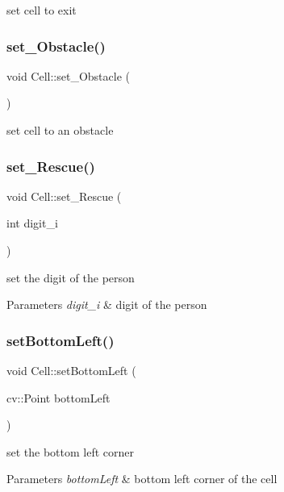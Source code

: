 set cell to exit \mbox{\label{class_cell_af7d43434293cf3df61c07b95af4c3be6}} 
\subsubsection{\texorpdfstring{set\+\_\+\+Obstacle()}{set\_Obstacle()}}
{\footnotesize\ttfamily void Cell\+::set\+\_\+\+Obstacle (\begin{DoxyParamCaption}{ }\end{DoxyParamCaption})}

set cell to an obstacle \mbox{\label{class_cell_a9fbed46923e15b7c576b438017ba0673}} 
\subsubsection{\texorpdfstring{set\+\_\+\+Rescue()}{set\_Rescue()}}
{\footnotesize\ttfamily void Cell\+::set\+\_\+\+Rescue (\begin{DoxyParamCaption}\item[{int}]{digit\+\_\+i }\end{DoxyParamCaption})}

set the digit of the person 
\begin{DoxyParams}{Parameters}
{\em digit\+\_\+i} & digit of the person \\
\hline
\end{DoxyParams}
\mbox{\label{class_cell_a86387a50a4c3f641eede253ce6cfcddb}} 
\subsubsection{\texorpdfstring{set\+Bottom\+Left()}{setBottomLeft()}}
{\footnotesize\ttfamily void Cell\+::set\+Bottom\+Left (\begin{DoxyParamCaption}\item[{cv\+::\+Point}]{bottom\+Left }\end{DoxyParamCaption})}

set the bottom left corner 
\begin{DoxyParams}{Parameters}
{\em bottom\+Left} & bottom left corner of the cell \\
\hline
\end{DoxyParams}
\mbox{\label{class_cell_ae68ff90cfde34cec208e8e74ce3f2745}} 
